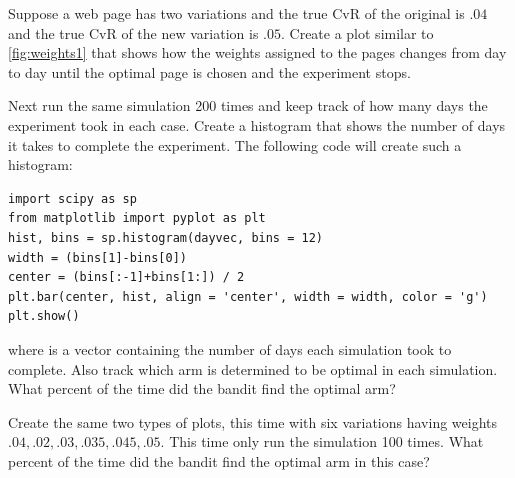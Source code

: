 \begin{problem}
Suppose a web page has two variations and the true CvR of the original is
$.04$ and the true CvR of the new variation is $.05$.
Create a plot similar to \ref{fig:weights1} that shows how the weights
assigned to the pages changes from day to day until the optimal page is chosen and the experiment stops.

Next run the same simulation 200 times and keep track of how many days
the experiment took in each case.  Create a histogram that shows the
number of days it takes to complete the experiment.
The following code will create such a histogram:
\begin{lstlisting}
import scipy as sp
from matplotlib import pyplot as plt
hist, bins = sp.histogram(dayvec, bins = 12)
width = (bins[1]-bins[0])
center = (bins[:-1]+bins[1:]) / 2
plt.bar(center, hist, align = 'center', width = width, color = 'g')
plt.show()
\end{lstlisting}
where  is a vector containing the number of days each simulation took to complete.
Also track which arm is determined to be optimal in each simulation.
What percent of the time did the bandit find the optimal arm?

Create the same two types of plots, this time with six variations having
weights $.04,.02,.03,.035,.045,.05$.  This time only run the simulation 100 times.
What percent of the time did the bandit find the optimal arm in this case?
\end{problem}


